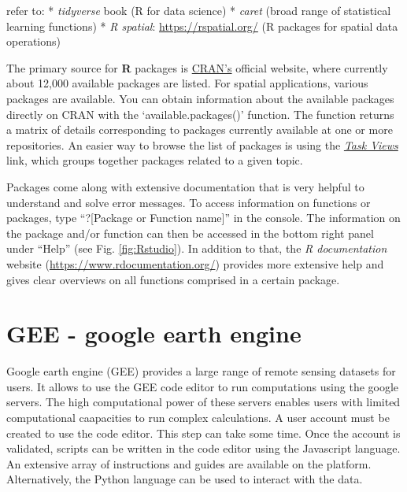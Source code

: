 \documentclass[
  10pt,
  b5paper,
  oneside]{book}
\begin{document}
refer to:
* \emph{tidyverse} book (R for data science)
* \emph{caret} (broad range of statistical learning functions)
* \emph{R spatial}: \url{https://rspatial.org/} (R packages for spatial data operations)

The primary source for \textbf{R} packages is \href{https://cran.r-project.org/}{CRAN's} official website, where currently about 12,000 available packages are listed. For spatial applications, various packages are available. You can obtain information about the available packages directly on CRAN with the `available.packages()' function. The function returns a matrix of details corresponding to packages currently available at one or more repositories. An easier way to browse the list of packages is using the \href{https://cran.r-project.org/web/views/}{\emph{Task Views}} link, which groups together packages related to a given topic.

Packages come along with extensive documentation that is very helpful to understand and solve error messages. To access information on functions or packages, type ``?{[}Package or Function name{]}'' in the console. The information on the package and/or function can then be accessed in the bottom right panel under ``Help'' (see Fig. \ref{fig:Rstudio}). In addition to that, the \emph{R documentation} website (\url{https://www.rdocumentation.org/}) provides more extensive help and gives clear overviews on all functions comprised in a certain package.

\hypertarget{gee---google-earth-engine}{%
\section{GEE - google earth engine}\label{gee---google-earth-engine}}

Google earth engine (GEE) provides a large range of remote sensing datasets for users. It allows to use the GEE code editor to run computations using the google servers. The high computational power of these servers enables users with limited computational caapacities to run complex calculations.
A user account must be created to use the code editor. This step can take some time. Once the account is validated, scripts can be written in the code editor using the Javascript language. An extensive array of instructions and guides are available on the platform. Alternatively, the Python language can be used to interact with the data.
\end{document}

